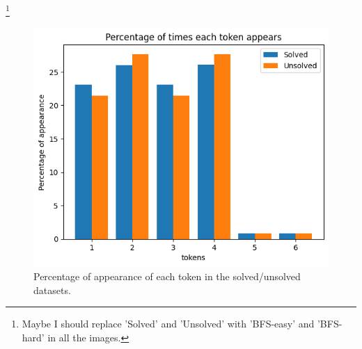 \footnote{Maybe I should replace 'Solved' and 'Unsolved' with 'BFS-easy' and 'BFS-hard' in all the images.}

\begin{figure}
	\centering
	\includegraphics[scale=0.6]{fig/tokens_hist.png}
	\caption{Percentage of appearance of each token in the solved/unsolved datasets. }
	\label{fig:tokens_hist}
\end{figure}

